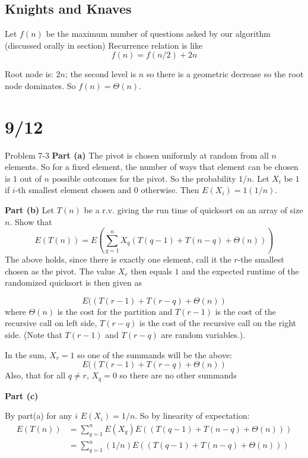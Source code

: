 \documentclass{article}
\begin{document}
\subsection{Knights and Knaves}
Let $f(n)$ be the maximum number of questions asked by our algorithm (discussed orally in section)
Recurrence relation is like
$$f(n) = f(n/2) + 2n$$

Root node is: $2n$; the second level is $n$ so there is a geometric decrease so the root node dominates.  So $f(n) = \Theta(n)$.


\section{9/12}
Problem 7-3 
\textbf{Part (a)}
The pivot is chosen uniformly at random from all $n$ elements.  So for a fixed element, the number of ways that element can be chosen is $1$ out of $n$ possible outcomes for the pivot.  So the probability $1/n$.  Let $X_i$ be $1$ if $i$-th smallest element chosen and $0$ otherwise.  Then $E(X_i) = 1 (1/n)$.

\textbf{Part (b)}
Let $T(n)$ be a r.v. giving the run time of quicksort on an array of size $n$.  Show that
    $$E(T(n)) = E\left(\sum_{q=1}^n X_q \left(T(q-1) + T(n-q) + \Theta(n) \right) \right)$$
The above holds, since there is exactly one element, call it the $r$-the smallest chosen as the pivot.  The value $X_r$ then equals $1$ and the expected runtime of the randomized quicksort is then given as

$$E(\left(T(r-1) + T(r-q) + \Theta(n) \right)$$
where $\Theta(n)$ is the cost for the partition and $T(r-1)$ is the cost of the recursive call on left side, $T(r-q)$ is the cost of the recursive call on the right side. (Note that $T(r-1)$ and $T(r-q)$ are random variables.).  

In the sum, $X_r = 1$ so one of the summands will be the above: $$E(\left(T(r-1) + T(r-q) + \Theta(n) \right)$$  Also, that for all $q \neq r$, $X_q = 0$ so there are no other summands


\textbf{Part (c)}

By part(a) for any $i$ $E(X_i)=1/n$.  So by linearity of expectation:
\begin{align*}
        E(T(n)) & = \sum_{q=1}^n E(X_q) E\left(\left(T(q-1) + T(n-q) + \Theta(n) \right) \right)\\
        & = \sum_{q=1}^n (1/n) E\left(\left(T(q-1) + T(n-q) + \Theta(n) \right) \right)\\
\end{align*}
\end{document}
